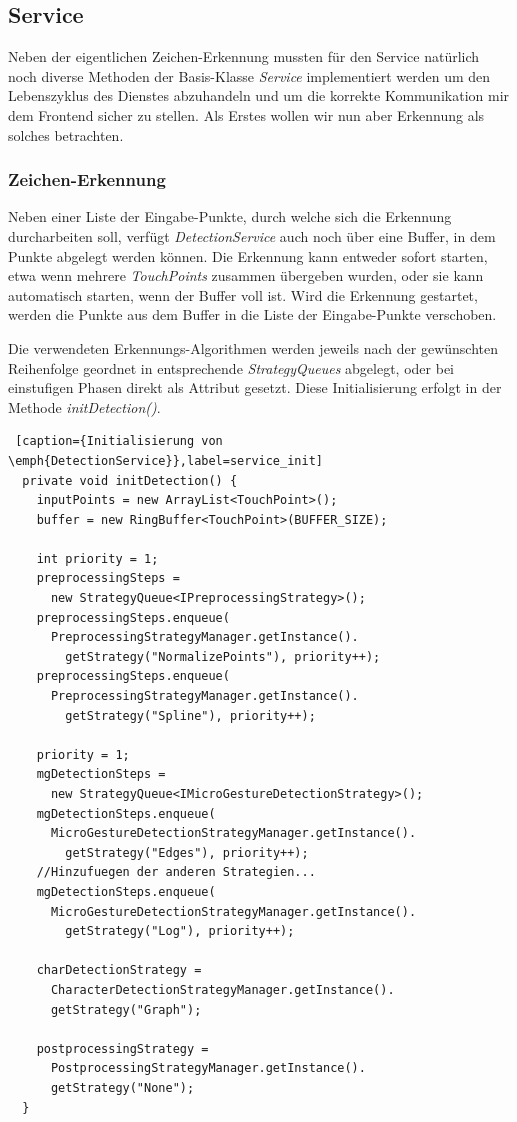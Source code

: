 \subsection{Service}\label{lbl_be_impl_service}

Neben der eigentlichen Zeichen-Erkennung mussten für den Service natürlich noch diverse Methoden der Basis-Klasse \emph{Service} implementiert werden um den Lebenszyklus des Dienstes abzuhandeln und um die korrekte Kommunikation mir dem Frontend sicher zu stellen. Als Erstes wollen wir nun aber Erkennung als solches betrachten.

\subsubsection{Zeichen-Erkennung}

Neben einer Liste der Eingabe-Punkte, durch welche sich die Erkennung durcharbeiten soll, verfügt \emph{DetectionService} auch noch über eine Buffer, in dem Punkte abgelegt werden können. Die Erkennung kann entweder sofort starten, etwa wenn mehrere \emph{TouchPoints} zusammen übergeben wurden, oder sie kann automatisch starten, wenn der Buffer voll ist. Wird die Erkennung gestartet, werden die Punkte aus dem Buffer in die Liste der Eingabe-Punkte verschoben.

Die verwendeten Erkennungs-Algorithmen werden jeweils nach der gewünschten Reihenfolge geordnet in entsprechende \emph{StrategyQueues} abgelegt, oder bei einstufigen Phasen direkt als Attribut gesetzt. Diese Initialisierung erfolgt in der Methode \emph{initDetection()}.

\begin{lstlisting} [caption={Initialisierung von \emph{DetectionService}},label=service_init]
  private void initDetection() {
    inputPoints = new ArrayList<TouchPoint>();
    buffer = new RingBuffer<TouchPoint>(BUFFER_SIZE);

    int priority = 1;
    preprocessingSteps = 
      new StrategyQueue<IPreprocessingStrategy>();
    preprocessingSteps.enqueue(
      PreprocessingStrategyManager.getInstance().
        getStrategy("NormalizePoints"), priority++);
    preprocessingSteps.enqueue(
      PreprocessingStrategyManager.getInstance().
        getStrategy("Spline"), priority++);	

    priority = 1;
    mgDetectionSteps = 
      new StrategyQueue<IMicroGestureDetectionStrategy>();
    mgDetectionSteps.enqueue(
      MicroGestureDetectionStrategyManager.getInstance().
        getStrategy("Edges"), priority++);
    //Hinzufuegen der anderen Strategien...
    mgDetectionSteps.enqueue(
      MicroGestureDetectionStrategyManager.getInstance().
        getStrategy("Log"), priority++);

    charDetectionStrategy = 
      CharacterDetectionStrategyManager.getInstance().
      getStrategy("Graph");

    postprocessingStrategy = 
      PostprocessingStrategyManager.getInstance().
      getStrategy("None");
  }
\end{lstlisting}


